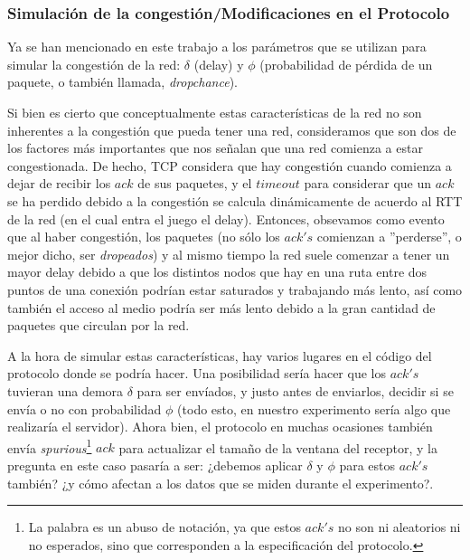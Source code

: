 \subsubsection*{Simulaci\'on de la congesti\'on/Modificaciones en el Protocolo}
\par Ya se han mencionado en este trabajo a los par\'ametros que se utilizan
para simular la congesti\'on de la red: $\delta$ (delay) y $\phi$ (probabilidad
de p\'erdida de un paquete, o también llamada, \emph{dropchance}).

\par Si bien es cierto que conceptualmente estas caracter\'isticas de la red no
son inherentes a la congesti\'on que pueda tener una red, consideramos que son
dos de los factores m\'as importantes que nos se\~nalan que una red comienza a
estar congestionada. De hecho, TCP considera que hay congesti\'on cuando
comienza a dejar de recibir los $ack$ de sus paquetes, y el $timeout$ para
considerar que un $ack$ se ha perdido debido a la congesti\'on se calcula
din\'amicamente de acuerdo al RTT de la red (en el cual entra el juego el
delay). Entonces, obsevamos como evento que al haber congesti\'on, los paquetes
(no s\'olo los $ack's$ comienzan a ''perderse'', o mejor dicho, ser
\textit{dropeados}) y al mismo tiempo la red suele comenzar a tener un mayor
delay debido a que los distintos nodos que hay en una ruta entre dos puntos de
una conexi\'on podr\'ian estar saturados y trabajando m\'as lento, as\'i como
tambi\'en el acceso al medio podr\'ia ser m\'as lento debido a la gran cantidad
de paquetes que circulan por la red.

\par A la hora de simular estas caracter\'isticas, hay varios lugares en el
c\'odigo del protocolo donde se podr\'ia hacer. Una posibilidad ser\'ia hacer
que los $ack's$ tuvieran una demora $\delta$ para ser env\'iados, y justo antes
de enviarlos, decidir si se env\'ia o no con probabilidad $\phi$ (todo esto, en
nuestro experimento ser\'ia algo que realizar\'ia el servidor). Ahora bien, el
protocolo en muchas ocasiones tambi\'en env\'ia \emph{spurious}\footnote{La
palabra es un abuso de notaci\'on, ya que estos $ack's$ no son ni aleatorios ni
no esperados, sino que corresponden a la especificaci\'on del protocolo.} $ack$
para actualizar el tama\~no de la ventana del receptor, y la pregunta en este
caso pasar\'ia a ser: ¿debemos aplicar $\delta$ y $\phi$ para estos $ack's$
tambi\'en? ¿y c\'omo afectan a los datos que se miden durante el experimento?.

